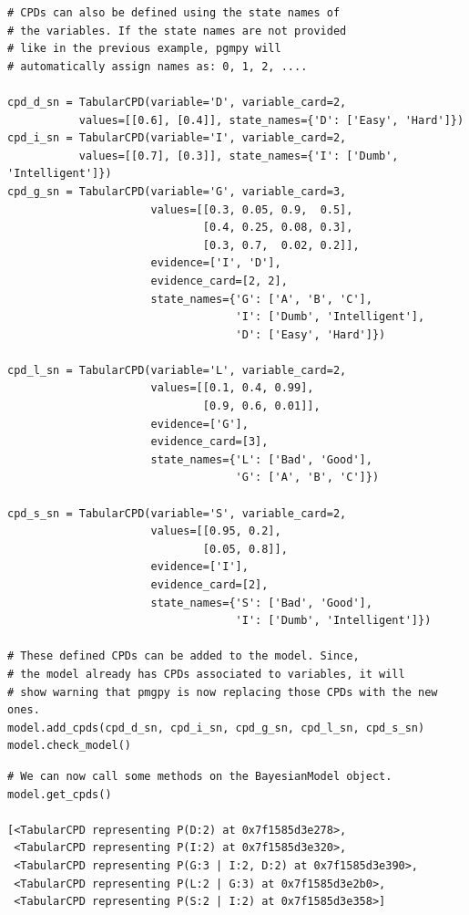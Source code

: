 \documentclass{article}
\begin{document}
\begin{verbatim}
# CPDs can also be defined using the state names of 
# the variables. If the state names are not provided
# like in the previous example, pgmpy will
# automatically assign names as: 0, 1, 2, ....

cpd_d_sn = TabularCPD(variable='D', variable_card=2, 
           values=[[0.6], [0.4]], state_names={'D': ['Easy', 'Hard']})
cpd_i_sn = TabularCPD(variable='I', variable_card=2, 
           values=[[0.7], [0.3]], state_names={'I': ['Dumb', 'Intelligent']})
cpd_g_sn = TabularCPD(variable='G', variable_card=3,
                      values=[[0.3, 0.05, 0.9,  0.5],
                              [0.4, 0.25, 0.08, 0.3],
                              [0.3, 0.7,  0.02, 0.2]],
                      evidence=['I', 'D'],
                      evidence_card=[2, 2],
                      state_names={'G': ['A', 'B', 'C'],
                                   'I': ['Dumb', 'Intelligent'],
                                   'D': ['Easy', 'Hard']})

cpd_l_sn = TabularCPD(variable='L', variable_card=2,
                      values=[[0.1, 0.4, 0.99],
                              [0.9, 0.6, 0.01]],
                      evidence=['G'],
                      evidence_card=[3],
                      state_names={'L': ['Bad', 'Good'],
                                   'G': ['A', 'B', 'C']})

cpd_s_sn = TabularCPD(variable='S', variable_card=2,
                      values=[[0.95, 0.2],
                              [0.05, 0.8]],
                      evidence=['I'],
                      evidence_card=[2],
                      state_names={'S': ['Bad', 'Good'],
                                   'I': ['Dumb', 'Intelligent']})

# These defined CPDs can be added to the model. Since, 
# the model already has CPDs associated to variables, it will
# show warning that pmgpy is now replacing those CPDs with the new ones.
model.add_cpds(cpd_d_sn, cpd_i_sn, cpd_g_sn, cpd_l_sn, cpd_s_sn)
model.check_model()
\end{verbatim}

\begin{verbatim}
# We can now call some methods on the BayesianModel object.
model.get_cpds()

[<TabularCPD representing P(D:2) at 0x7f1585d3e278>,
 <TabularCPD representing P(I:2) at 0x7f1585d3e320>,
 <TabularCPD representing P(G:3 | I:2, D:2) at 0x7f1585d3e390>,
 <TabularCPD representing P(L:2 | G:3) at 0x7f1585d3e2b0>,
 <TabularCPD representing P(S:2 | I:2) at 0x7f1585d3e358>]
\end{verbatim}
\end{document}
